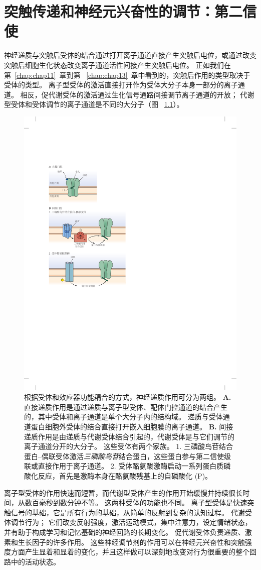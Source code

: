 \chapter{突触传递和神经元兴奋性的调节：第二信使} \label{chap:chap14}

神经递质与突触后受体的结合通过打开离子通道直接产生突触后电位，或通过改变突触后细胞生化状态改变离子通道活性间接产生突触后电位。
正如我们在第~\ref{chap:chap11}~章到第 ~\ref{chap:chap13}~章中看到的，突触后作用的类型取决于受体的类型。
离子型受体的激活直接打开作为受体大分子本身一部分的离子通道。
相反，促代谢受体的激活通过生化信号通路间接调节离子通道的开放；
代谢型受体和受体调节的离子通道是不同的大分子（图 ~\ref{fig:14_1}）。


\begin{figure}[htbp]
	\centering
	\includegraphics[width=0.5\linewidth]{chap14/fig_14_1}
	\caption{根据受体和效应器功能耦合的方式，神经递质作用可分为两组。
		\textbf{A.} 直接递质作用是通过递质与离子型受体、配体门控通道的结合产生的，其中受体和离子通道是单个大分子内的结构域。
		递质与受体通道蛋白细胞外受体的结合直接打开嵌入细胞膜的离子通道。
		\textbf{B.} 间接递质作用是由递质与代谢受体结合引起的，代谢受体是与它们调节的离子通道分开的大分子。
		这些受体有两个家族。
		1. 三磷酸鸟苷结合蛋白–偶联受体激活\textit{三磷酸鸟苷}结合蛋白，这些蛋白参与第二信使级联或直接作用于离子通道。
		2. 受体酪氨酸激酶启动一系列蛋白质磷酸化反应，首先是激酶本身在酪氨酸残基上的自磷酸化 (P)。}
	\label{fig:14_1}
\end{figure}


离子型受体的作用快速而短暂，而代谢型受体产生的作用开始缓慢并持续很长时间，从数百毫秒到数分钟不等。
这两种受体的功能也不同。
离子型受体是快速突触信号的基础，它是所有行为的基础，从简单的反射到复杂的认知过程。
代谢受体调节行为；
它们改变反射强度，激活运动模式，集中注意力，设定情绪状态，并有助于构成学习和记忆基础的神经回路的长期变化。
促代谢受体负责递质、激素和生长因子的许多作用。
这些神经调节剂的作用可以在神经元兴奋性和突触强度方面产生显着和显着的变化，并且这样做可以深刻地改变对行为很重要的整个回路中的活动状态。


